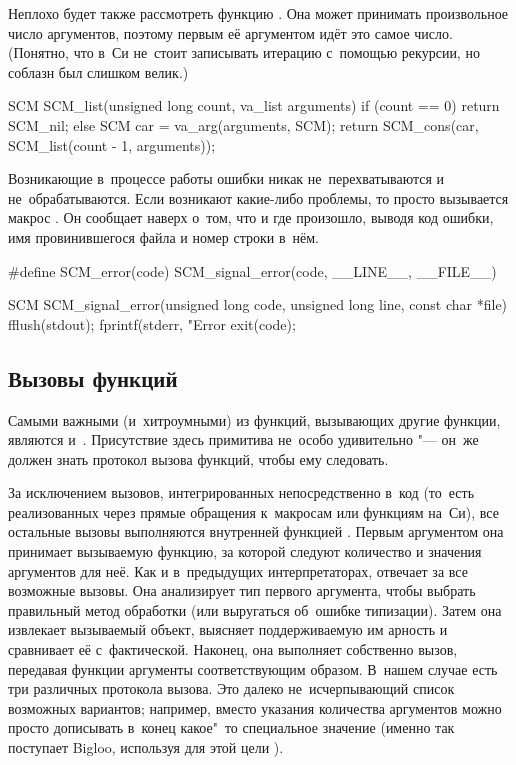 Неплохо будет также рассмотреть функцию . Она может принимать
произвольное число аргументов, поэтому первым её аргументом идёт это самое
число. (Понятно, что в~Си не~стоит записывать итерацию с~помощью рекурсии, но
соблазн был слишком велик.)

\begin{code:c}
SCM SCM_list(unsigned long count, va_list arguments)
{
    if (count == 0) {
        return SCM_nil;
    }
    else {
        SCM car = va_arg(arguments, SCM);
        return SCM_cons(car, SCM_list(count - 1, arguments));
    }
}
\end{code:c}

Возникающие в~процессе работы ошибки никак не~перехватываются и
не~обрабатываются. Если возникают какие-либо проблемы, то просто вызывается
макрос . Он сообщает наверх о~том, что и где произошло, выводя
код ошибки, имя провинившегося файла и номер строки в~нём.

\begin{code:c}
#define SCM_error(code) SCM_signal_error(code, __LINE__, __FILE__)

SCM SCM_signal_error(unsigned long code,
                     unsigned long line,
                     const char *file)
{
    fflush(stdout);
    fprintf(stderr, "Error %
    exit(code);
}
\end{code:c}


\subsection{Вызовы функций}\label{cc/runtime/ssect:invoke}

Самыми важными (и~хитроумными) из функций, вызывающих другие функции, являются
 и~. Присутствие здесь примитива  не~особо
удивительно "--- он~же должен знать протокол вызова функций, чтобы ему
следовать.

За исключением вызовов, интегрированных непосредственно в~код (то~есть
реализованных через прямые обращения к~макросам или функциям на~Си), все
остальные вызовы выполняются внутренней функцией . Первым
аргументом она принимает вызываемую функцию, за которой следуют количество и
значения аргументов для неё. Как и в~предыдущих интерпретаторах,
 отвечает за все возможные вызовы. Она анализирует тип первого
аргумента, чтобы выбрать правильный метод обработки (или выругаться об~ошибке
типизации). Затем она извлекает вызываемый объект, выясняет поддерживаемую им
арность и сравнивает её с~фактической. Наконец, она выполняет собственно вызов,
передавая функции аргументы соответствующим образом. В~нашем случае есть три
различных протокола вызова. Это далеко не~исчерпывающий список возможных
вариантов; например, вместо указания количества аргументов можно просто
дописывать в~конец какое"~то специальное значение (именно так поступает Bigloo,
используя для этой цели ).

